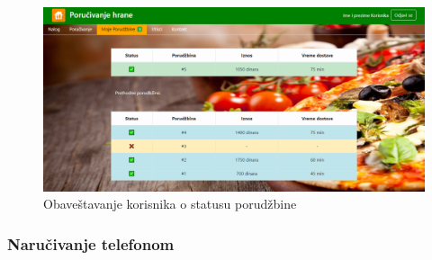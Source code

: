 \begin{figure}[!h]
    \includegraphics[width=1\textwidth]{slike/porudzbina.png}
    \caption{Obaveštavanje korisnika o statusu porudžbine} %
    \label{fig:slika_obrada_porudzbina}
\end{figure}

\newpage
\subsubsection{Naručivanje telefonom}

